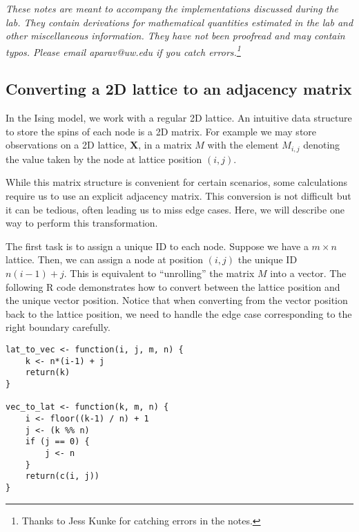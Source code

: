 \documentclass[11pt]{article}
\begin{document}
\begin{center}
  \setlength\fboxsep{0.5cm}
\end{center}

\textit{These notes are meant to accompany the implementations discussed during the lab. They contain derivations for mathematical quantities estimated in the lab and other miscellaneous information. They have not been proofread and may contain typos. Please email aparav@uw.edu if you catch errors.\footnote{Thanks to Jess Kunke for catching errors in the notes.}}

\subsection*{Converting a 2D lattice to an adjacency matrix}

In the Ising model, we work with a regular 2D lattice. An intuitive data structure to store the spins of each node is a 2D matrix. For example we may store observations on a 2D lattice, $\mathbf{X}$, in a matrix $M$ with the element $M_{i, j}$ denoting the value taken by the node at lattice position $(i, j)$.

While this matrix structure is convenient for certain scenarios, some calculations require us to use an explicit adjacency matrix. This conversion is not difficult but it can be tedious, often leading us to miss edge cases. Here, we will describe one way to perform this transformation.

The first task is to assign a unique ID to each node. Suppose we have a $m \times n$ lattice. Then, we can assign a node at position $(i, j)$ the unique ID $n(i-1) + j$. This is equivalent to ``unrolling'' the matrix $M$ into a vector. The following R code demonstrates how to convert between the lattice position and the unique vector position. Notice that when converting from the vector position back to the lattice position, we need to handle the edge case corresponding to the right boundary carefully.

\begin{verbatim}
lat_to_vec <- function(i, j, m, n) {
    k <- n*(i-1) + j
    return(k)
}

vec_to_lat <- function(k, m, n) {
    i <- floor((k-1) / n) + 1
    j <- (k %% n)
    if (j == 0) {
        j <- n
    }
    return(c(i, j))
}
\end{verbatim}
\end{document}
